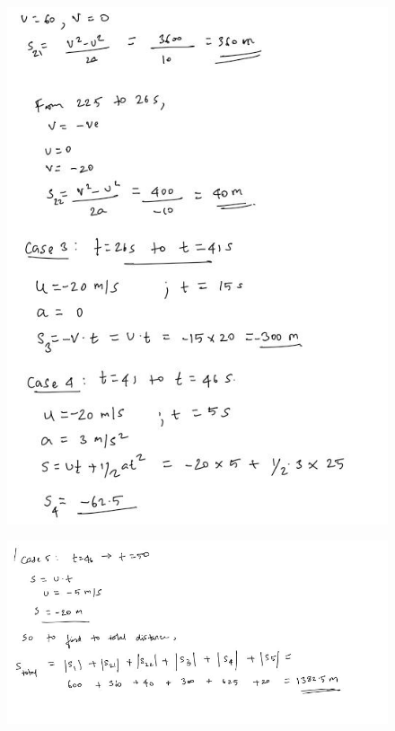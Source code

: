 \documentclass[11pt]{article}
\begin{document}
\begin{figure}[H]
	\includegraphics[scale=0.55]{a22.jpg}
	\label{fig: Polygon Law}
\end{figure}


\begin{figure}[H]
	\includegraphics[scale=0.55]{a23.jpg}
	\label{fig: Polygon Law}
\end{figure}
\pagebreak
\end{document}
